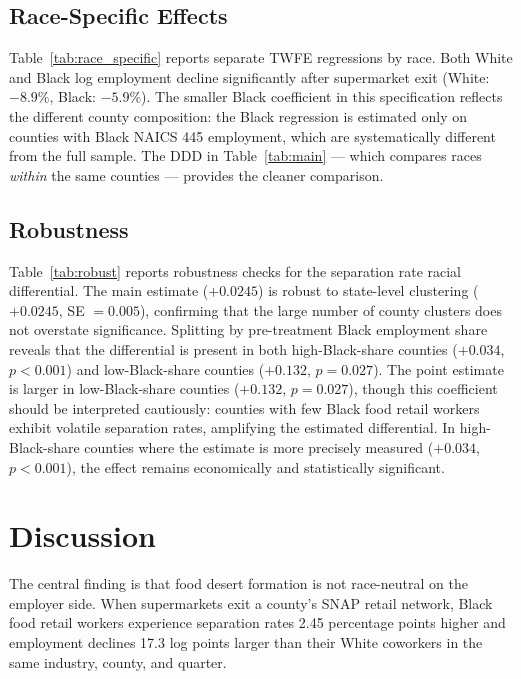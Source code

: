 \documentclass[12pt]{article}
\begin{document}
\subsection{Race-Specific Effects}



Table~\ref{tab:race_specific} reports separate TWFE regressions by race. Both White and Black log employment decline significantly after supermarket exit (White: $-8.9\%$, Black: $-5.9\%$). The smaller Black coefficient in this specification reflects the different county composition: the Black regression is estimated only on counties with Black NAICS 445 employment, which are systematically different from the full sample. The DDD in Table~\ref{tab:main} --- which compares races \textit{within} the same counties --- provides the cleaner comparison.

\subsection{Robustness}



Table~\ref{tab:robust} reports robustness checks for the separation rate racial differential. The main estimate ($+0.0245$) is robust to state-level clustering ($+0.0245$, SE $= 0.005$), confirming that the large number of county clusters does not overstate significance. Splitting by pre-treatment Black employment share reveals that the differential is present in both high-Black-share counties ($+0.034$, $p < 0.001$) and low-Black-share counties ($+0.132$, $p = 0.027$). The point estimate is larger in low-Black-share counties ($+0.132$, $p = 0.027$), though this coefficient should be interpreted cautiously: counties with few Black food retail workers exhibit volatile separation rates, amplifying the estimated differential. In high-Black-share counties where the estimate is more precisely measured ($+0.034$, $p < 0.001$), the effect remains economically and statistically significant.

\section{Discussion}

The central finding is that food desert formation is not race-neutral on the employer side. When supermarkets exit a county's SNAP retail network, Black food retail workers experience separation rates 2.45 percentage points higher and employment declines 17.3 log points larger than their White coworkers in the same industry, county, and quarter.
\end{document}
